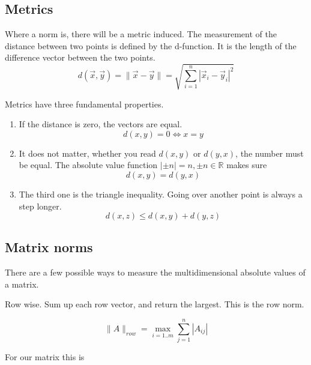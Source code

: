 \documentclass[a4paper]{article}
\begin{document}
\begin{Example}
\subsection{Metrics}

Where a norm is, there will be a metric induced.
The measurement of the distance between two points is defined by the d-function. It is the length of the difference vector between the two points.\\

\begin{displaymath}
    d(\vec{x}, \vec{y}) = \|\vec{x}-\vec{y}\| = \sqrt{\sum_{i=1}^{n}|\vec{x}_{i}-\vec{y}_{i}|^2}
\end{displaymath}

Metrics have three fundamental properties.
\begin{enumerate}
\item If the distance is zero, the vectors are equal.
\begin{displaymath}
d(x,y) = 0 \iff x = y
\end{displaymath}
\item It does not matter, whether you read $d(x,y)$ or $d(y,x)$, the number must be equal. The absolute value function $|\pm n| = n, \pm n \in \mathbb{R}$ makes sure
\begin{displaymath}
d(x,y) = d(y,x)
\end{displaymath}
\item The third one is the triangle inequality. Going over another point is always a step longer.
\begin{displaymath}
d(x,z) \leq d(x,y) + d(y,z) 
\end{displaymath}
\end{enumerate}



\subsection{Matrix norms}

There are a few possible ways to measure the multidimensional absolute values of a matrix.

Row wise. Sum up each row vector, and return the largest. This is the row norm.

\begin{displaymath}
\|A\|_{row} = \max_{i=1..m} { \sum_{j=1}^{n} |A_{ij}| }
\end{displaymath}

For our matrix this is


\end{Example}
\end{document}
